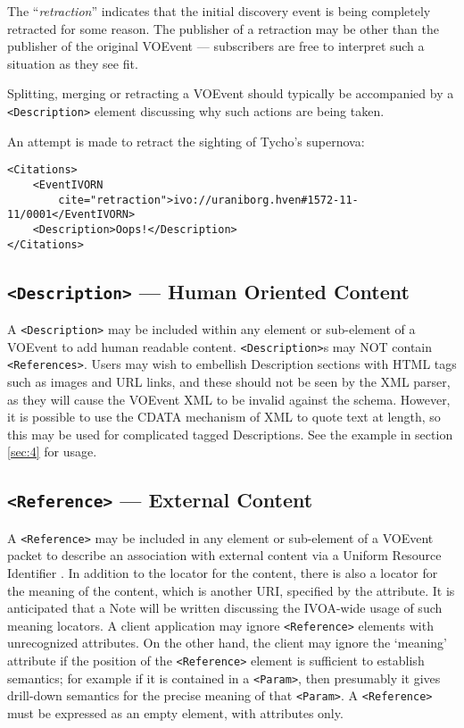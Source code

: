 \documentclass[11pt,a4paper]{ivoa}
\begin{document}
The ``\emph{retraction}''  indicates that the initial discovery event
is being completely retracted for some reason. The publisher of a retraction may
be other than the publisher of the original VOEvent --- subscribers are free to
interpret such a situation as they see fit.

Splitting, merging or retracting a VOEvent should typically be accompanied by a
\verb|<Description>| element discussing why such actions are being taken.

An attempt is made to retract the sighting of Tycho's supernova:
\begin{lstlisting}
<Citations>
    <EventIVORN 
        cite="retraction">ivo://uraniborg.hven#1572-11-11/0001</EventIVORN>
    <Description>Oops!</Description>
</Citations>
\end{lstlisting}

\subsection{\texttt{<Description>} --- Human Oriented Content}
\label{sec:3.8}
A \verb|<Description>| may be included within any element or sub-element of a
VOEvent to add human readable content. \verb|<Description>|s may NOT
contain
\verb|<References>|. Users may wish to embellish Description sections with HTML tags
such as images and URL links, and these should not be seen by the XML parser, as
they will cause the VOEvent XML to be invalid against the schema. However, it is
possible to use the CDATA mechanism of XML to quote text at length, so this may
be used for complicated tagged Descriptions. See the example in section
\ref{sec:4} for usage.

\subsection{\texttt{<Reference>} --- External Content}
\label{sec:3.9}

A \verb|<Reference>| may be included in any element or sub-element of a VOEvent
packet to describe an association with external content via a Uniform Resource
Identifier \citep{std:RFC3986}. In addition to the locator for the
content, there is also a locator for the meaning of the content, which is
another URI, specified by the  attribute. It is anticipated that a
Note will be written discussing the IVOA-wide usage of such meaning locators. A
client application may ignore \verb|<Reference>| elements with
unrecognized  attributes. On the other hand, the client may ignore the `meaning'
attribute if the position of the \verb|<Reference>| element is sufficient to
establish semantics; for example if it is contained in a \verb|<Param>|, then
presumably it gives drill-down semantics for the precise meaning of that
\verb|<Param>|. A \verb|<Reference>| must be expressed as an empty element, with
attributes only.
\end{document}
